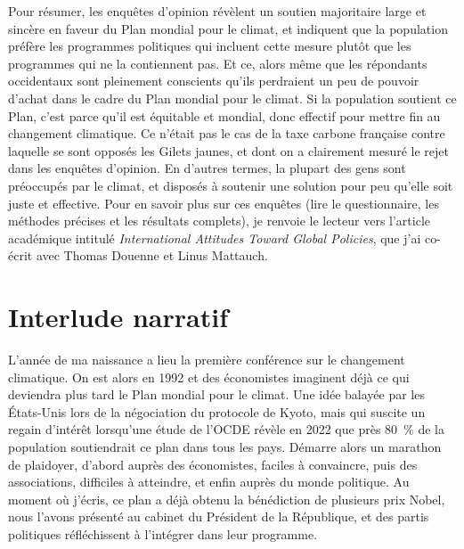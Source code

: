 \documentclass[a5paper,french]{memoir}
\begin{document}
Pour résumer, les enquêtes d'opinion révèlent un soutien majoritaire large et sincère en faveur du Plan mondial pour le climat, et indiquent que la population préfère les programmes politiques qui incluent cette mesure plutôt que les programmes qui ne la contiennent pas. Et ce, alors même que les répondants occidentaux sont pleinement conscients qu'ils perdraient un peu de pouvoir d'achat dans le cadre du Plan mondial pour le climat. 
Si la population soutient ce Plan, c'est parce qu'il est équitable et mondial, donc effectif pour mettre fin au changement climatique. Ce n'était pas le cas de la taxe carbone française contre laquelle se sont opposés les Gilets jaunes, et dont on a clairement mesuré le rejet dans les enquêtes d'opinion. En d'autres termes, la plupart des gens sont préoccupés par le climat, et disposés à soutenir une solution pour peu qu'elle soit juste et effective. 
Pour en savoir plus sur ces enquêtes (lire le questionnaire, les méthodes précises et les résultats complets), je renvoie le lecteur vers l'article académique intitulé \textit{International Attitudes Toward Global Policies}, que j'ai co-écrit avec Thomas Douenne et Linus Mattauch. 

\chapter{Interlude narratif}

L'année de ma naissance a lieu la première conférence sur le changement climatique. On est alors en 1992 et des économistes imaginent déjà ce qui deviendra plus tard le Plan mondial pour le climat. Une idée balayée par les États-Unis lors de la négociation du protocole de Kyoto, mais qui suscite un regain d'intérêt lorsqu'une étude de l'OCDE révèle en 2022 que près 80~\% de la population soutiendrait ce plan dans tous les pays. Démarre alors un marathon de plaidoyer, d'abord auprès des économistes, faciles à convaincre, puis des associations, difficiles à atteindre, et enfin auprès du monde politique. Au moment où j'écris, ce plan a déjà obtenu la bénédiction de plusieurs prix Nobel, nous l'avons présenté au cabinet du Président de la République, et des partis politiques réfléchissent à l'intégrer dans leur programme. 
\end{document}
